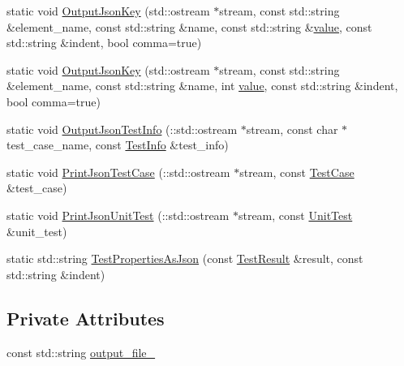 \begin{DoxyCompactItemize}
\item 
static void \mbox{\hyperlink{classtesting_1_1internal_1_1_json_unit_test_result_printer_a78cedc9b8afd033a90cd921f65a0f4c5}{Output\+Json\+Key}} (std\+::ostream $\ast$stream, const std\+::string \&element\+\_\+name, const std\+::string \&name, const std\+::string \&\mbox{\hyperlink{_obj__test_2lib_2googletest-master_2googlemock_2test_2gmock-matchers__test_8cc_a337b8a670efc0b086ad3af163f3121b6}{value}}, const std\+::string \&indent, bool comma=true)
\item 
static void \mbox{\hyperlink{classtesting_1_1internal_1_1_json_unit_test_result_printer_af7bacb58770f91639ac729c9b26e3f18}{Output\+Json\+Key}} (std\+::ostream $\ast$stream, const std\+::string \&element\+\_\+name, const std\+::string \&name, int \mbox{\hyperlink{_obj__test_2lib_2googletest-master_2googlemock_2test_2gmock-matchers__test_8cc_a337b8a670efc0b086ad3af163f3121b6}{value}}, const std\+::string \&indent, bool comma=true)
\item 
static void \mbox{\hyperlink{classtesting_1_1internal_1_1_json_unit_test_result_printer_aabb0a58b552c3cab446c614f3d13dc46}{Output\+Json\+Test\+Info}} (\+::std\+::ostream $\ast$stream, const char $\ast$test\+\_\+case\+\_\+name, const \mbox{\hyperlink{classtesting_1_1_test_info}{Test\+Info}} \&test\+\_\+info)
\item 
static void \mbox{\hyperlink{classtesting_1_1internal_1_1_json_unit_test_result_printer_a7c939f77c4e1245048a69af80f3db787}{Print\+Json\+Test\+Case}} (\+::std\+::ostream $\ast$stream, const \mbox{\hyperlink{classtesting_1_1_test_case}{Test\+Case}} \&test\+\_\+case)
\item 
static void \mbox{\hyperlink{classtesting_1_1internal_1_1_json_unit_test_result_printer_a8f4b1ac86fde9a895d2b26c1b013dd38}{Print\+Json\+Unit\+Test}} (\+::std\+::ostream $\ast$stream, const \mbox{\hyperlink{classtesting_1_1_unit_test}{Unit\+Test}} \&unit\+\_\+test)
\item 
static std\+::string \mbox{\hyperlink{classtesting_1_1internal_1_1_json_unit_test_result_printer_a4f98df9d853fce2981626d8adbf21a77}{Test\+Properties\+As\+Json}} (const \mbox{\hyperlink{classtesting_1_1_test_result}{Test\+Result}} \&result, const std\+::string \&indent)
\end{DoxyCompactItemize}
\subsection*{Private Attributes}
\begin{DoxyCompactItemize}
\item 
const std\+::string \mbox{\hyperlink{classtesting_1_1internal_1_1_json_unit_test_result_printer_a0471c1f94083f864b5e4d98fd9e80207}{output\+\_\+file\+\_\+}}
\end{DoxyCompactItemize}


